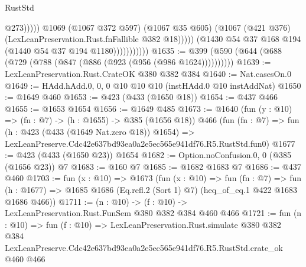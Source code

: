 \begin{lexlean}{RustStd}
\begin{coremodule}
                                      @273)))))
                            @1069
                            (@1067 @372 @597)
                            (@1067 @35 @605)
                            (@1067 (@421 @376) (LexLeanPreservation.Rust.fnFallible @382 @18)))))
                      (@1430 @54 @37 @168 @194 (@1440 @54 @37 @194 @1180)))))))))))
@1635 := @399 (@590 (@644 (@688 (@729 (@788 (@847 (@886 (@923 (@956 (@986 @1624))))))))))
@1639 := LexLeanPreservation.Rust.CrateOK @380 @382 @384
@1640 := Nat.casesOn.{0}
@1649 := HAdd.hAdd.{0, 0, 0} @10 @10 @10 (instHAdd.{0} @10 instAddNat)
@1650 := @1649 @460
@1653 := @423 (@433 (@1650 @18))
@1654 := @437 @466
@1655 := @1653 @1654
@1656 := @1649 @485
@1673 := @1640
    (fun (y : @10) => (fn : @7) -> (h : @1655) -> @385 (@1656 @18))
    @466
    (fun (fn : @7) =>
    fun (h : @423 (@433 (@1649 Nat.zero @18)) @1654) =>
    LexLeanPreserve.Cdc42e637bd93ea0a2e5ec565e941df76.R5.RustStd.fun0)
@1677 := @423 (@433 (@1650 @23)) @1654
@1682 := Option.noConfusion.{0, 0} (@385 (@1656 @23)) @7
@1683 := @160 @7
@1685 := @1682 @1683 @7
@1686 := @437 @460
@1703 := fun (x : @10) =>
  @1673
    (fun (x : @10) =>
    fun (fn : @7) =>
    fun (h : @1677) => @1685 @1686 (Eq.refl.{2} (Sort 1) @7) (heq_of_eq.{1} @422 @1683 @1686 @466))
@1711 := (n : @10) -> (f : @10) -> LexLeanPreservation.Rust.FunSem @380 @382 @384 @460 @466
@1721 := fun (n : @10) =>
  fun (f : @10) =>
  LexLeanPreservation.Rust.simulate
    @380
    @382
    @384
    LexLeanPreserve.Cdc42e637bd93ea0a2e5ec565e941df76.R5.RustStd.crate_ok
    @460
    @466
\end{coremodule}
\end{lexlean}
